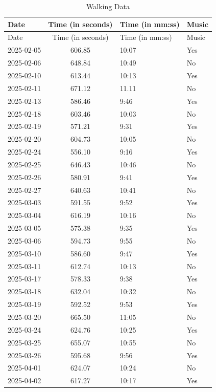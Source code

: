 \documentclass[11pt]{article}
\begin{document}
\begin{longtable}{l c l l}
\caption{Walking Data}
\label{tab:walking}\\
\toprule
Date        & Time (in seconds) & Time (in mm:ss) & Music \\
\midrule
\endfirsthead

\toprule
Date        & Time (in seconds) & Time (in mm:ss) & Music \\
\midrule
\endhead

\bottomrule
\endlastfoot

2025-02-05 & 606.85 & 10:07 & Yes \\
2025-02-06 & 648.84 & 10:49 & No  \\
2025-02-10 & 613.44 & 10:13 & Yes \\
2025-02-11 & 671.12 & 11.11 & No  \\
2025-02-13 & 586.46 & 9:46  & Yes \\
2025-02-18 & 603.46 & 10:03 & No  \\
2025-02-19 & 571.21 & 9:31  & Yes \\
2025-02-20 & 604.73 & 10:05 & No  \\
2025-02-24 & 556.10 & 9:16  & Yes \\
2025-02-25 & 646.43 & 10:46 & No  \\
2025-02-26 & 580.91 & 9:41  & Yes \\
2025-02-27 & 640.63 & 10:41 & No  \\
2025-03-03 & 591.55 & 9:52  & Yes \\
2025-03-04 & 616.19 & 10:16 & No  \\
2025-03-05 & 575.38 & 9:35  & Yes \\
2025-03-06 & 594.73 & 9:55  & No  \\
2025-03-10 & 586.60 & 9:47  & Yes \\
2025-03-11 & 612.74 & 10:13 & No  \\
2025-03-17 & 578.33 & 9:38  & Yes \\
2025-03-18 & 632.04 & 10:32 & No  \\
2025-03-19 & 592.52 & 9:53  & Yes \\
2025-03-20 & 665.50 & 11:05 & No  \\
2025-03-24 & 624.76 & 10:25 & Yes \\
2025-03-25 & 655.07 & 10:55 & No  \\
2025-03-26 & 595.68 & 9:56  & Yes \\
2025-04-01 & 624.07 & 10:24 & No  \\
2025-04-02 & 617.27 & 10:17 & Yes \\

\end{longtable}
\end{document}
